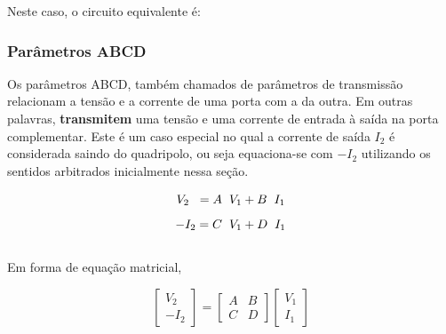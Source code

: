 \documentclass{article}
\numberwithin{equation}{section}
\let\dfr\dfrac
\begin{document}
Neste caso, o circuito equivalente é:

\begin{center}
\end{center}

\subsubsection{Parâmetros ABCD}
\label{subsubsec:quadripolostransm}
Os parâmetros ABCD, também chamados de parâmetros de transmissão relacionam a tensão e a corrente de uma porta com a da outra. Em outras palavras, \textbf{transmitem} uma tensão e uma corrente de entrada à saída na porta complementar. Este é um caso especial no qual a corrente de saída $I_{2}$ é considerada saindo do quadripolo, ou seja equaciona-se com $-I_{2}$ utilizando os sentidos arbitrados inicialmente nessa seção.

\begin{equation*}
    V_{2} \hspace{0.2cm} =A \hspace{0.2cm} V_{1}+ B \hspace{0.2cm} I_{1}
\end{equation*}
\begin{equation*}
    -I_{2}=C \hspace{0.2cm} V_{1}+D \hspace{0.2cm} I_{1}
\end{equation*}\\
Em forma de equação matricial,

\begin{equation}
    \begin{bmatrix}
        V_{2} \\
        -I_{2}
    \end{bmatrix}
    = %
    \begin{bmatrix}
        A & B \\
        C & D
    \end{bmatrix}
    \begin{bmatrix}
        V_{1} \\
        I_{1}
    \end{bmatrix}
\end{equation}
\end{document}
